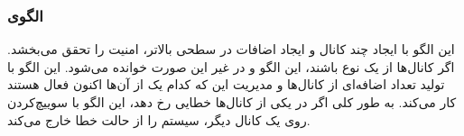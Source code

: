 \subsubsection{الگوی }
\label{safeDualChannelSec}
\begin{RTL}
این الگو با ایجاد چند کانال و ایجاد اضافات در سطحی بالاتر،
امنیت را تحقق می‌بخشد. اگر کانال‌ها از یک نوع باشند، این الگو
 و در غیر این صورت
 خوانده می‌شود.
این الگو با تولید تعداد اضافه‌ای از کانال‌ها و مدیریت این که
کدام یک از آن‌ها اکنون فعال هستند کار می‌کند. به طور کلی
اگر در یکی از کانال‌ها خطایی رخ دهد، این الگو با سوییچ‌کردن
روی یک کانال دیگر، سیستم را از حالت خطا خارج می‌کند.
\end{RTL}